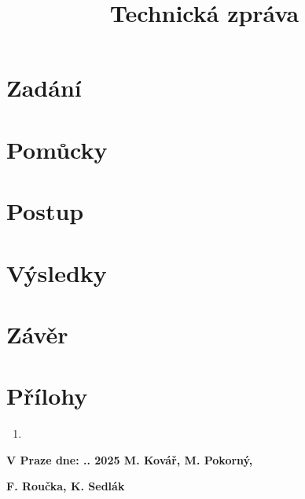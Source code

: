 \documentclass[12pt, a4paper]{article}
\title{Technická zpráva}
\date{}
\begin{document}
    \pagestyle{empty}
    
    \pagestyle{plain}
    \setcounter{page}{1}
    
    \maketitle
    
    \section{Zadání}
    

    \newpage

    \section{Pomůcky}
    

    \newpage

    \section{Postup}
    

    \newpage
    
    \section{Výsledky}
    

    \newpage

    \section{Závěr}
     

    \section{Přílohy}
    \begin{enumerate}
        \item 
    \end{enumerate}
    
\vspace*{\fill}
\textbf{V Praze dne: .. 2025\hspace{5cm} M. Kovář, M. Pokorný,}

\textbf{\hspace{9.3cm}F. Roučka, K. Sedlák}

\newpage

\end{document}
